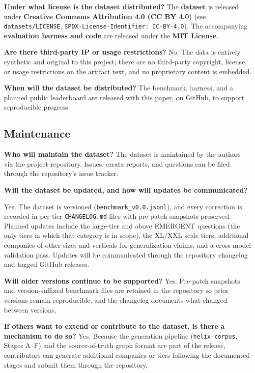\textbf{Under what license is the dataset distributed?}
The \textbf{dataset} is released under \textbf{Creative Commons Attribution 4.0
(CC BY 4.0)} (see \texttt{datasets/LICENSE},
\texttt{SPDX-License-Identifier: CC-BY-4.0}). The accompanying \textbf{evaluation
harness and code} are released under the \textbf{MIT License}.

\textbf{Are there third-party IP or usage restrictions?}
No. The data is entirely synthetic and original to this project; there are no
third-party copyright, license, or usage restrictions on the artifact text, and
no proprietary content is embedded.

\textbf{When will the dataset be distributed?}
The benchmark, harness, and a planned public leaderboard are released with this
paper, on GitHub, to support reproducible progress.

\subsection{Maintenance}

\textbf{Who will maintain the dataset?}
The dataset is maintained by the authors via the project repository. Issues,
errata reports, and questions can be filed through the repository's issue
tracker.

\textbf{Will the dataset be updated, and how will updates be communicated?}
{\sloppy
Yes. The dataset is versioned (\texttt{benchmark\_v0.0.jsonl}), and every
correction is recorded in per-tier \texttt{CHANGELOG.md} files with pre-patch
snapshots preserved. Planned updates include the large-tier and above EMERGENT
questions (the only tiers in which that category is in scope), the XL/XXL scale
tiers, additional companies of other sizes
and verticals for generalization claims, and a cross-model validation pass.
Updates will be communicated through the repository changelog and tagged GitHub
releases.\par}

\textbf{Will older versions continue to be supported?}
Yes. Pre-patch snapshots and version-suffixed benchmark files are retained in the
repository so prior versions remain reproducible, and the changelog documents
what changed between versions.

\textbf{If others want to extend or contribute to the dataset, is there a
mechanism to do so?}
Yes. Because the generation pipeline (\texttt{helix-corpus}, Stages A--F) and the
source-of-truth graph format are part of the release, contributors can generate
additional companies or tiers following the documented stages and submit them
through the repository.

